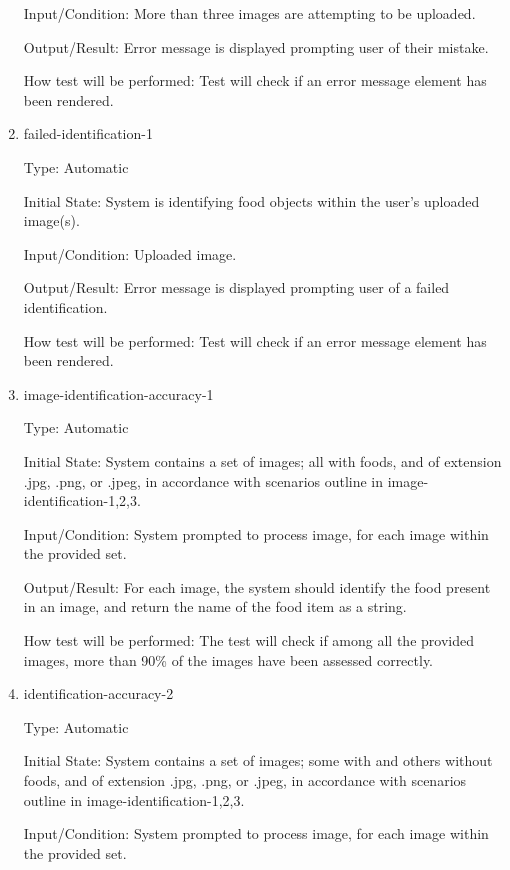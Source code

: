 \documentclass[12pt, titlepage]{article}
\begin{document}
\begin{enumerate}
		Input/Condition: More than three images are attempting to be uploaded.
		
		Output/Result: Error message is displayed prompting user of their 
		mistake.
		
		How test will be performed: Test will check if an error message element 
		has been rendered.
		
		\item{failed-identification-1\\}
		
		Type: Automatic
		
		Initial State: System is identifying food objects within the user's 
		uploaded image(s).
		
		Input/Condition: Uploaded image.
		
		Output/Result: Error message is displayed prompting user of a failed 
		identification.
		
		How test will be performed: Test will check if an error message element 
		has been rendered.
		
		\item{image-identification-accuracy-1\\}
		
		Type: Automatic
		
		Initial State: System contains a set of images; all with foods, and of 
		extension .jpg, .png, or .jpeg, in accordance with scenarios outline in 
		image-identification-1,2,3.
		
		Input/Condition: System prompted to process image, for each image 
		within the provided set.
		
		Output/Result: For each image, the system should identify the food 
		present in an image, and return the name of the food item as a string.
		
		How test will be performed: The test will check if among all the 
		provided images, more than 90\% of the images have been assessed 
		correctly.
		
		\item{identification-accuracy-2\\}
		
		Type: Automatic
		
		Initial State: System contains a set of images; some with and others 
		without foods, and of extension .jpg, .png, or 
		.jpeg, in accordance with scenarios outline in 
		image-identification-1,2,3.
		
		Input/Condition: System prompted to process image, for each image 
		within the provided set.
		

\end{enumerate}
\end{document}
